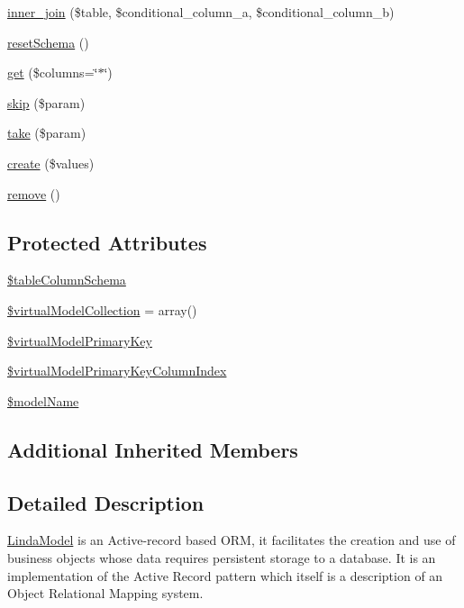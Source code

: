 \begin{DoxyCompactItemize}
\item 
\hyperlink{class_linda_model_a208a1a59285ee5a95a90c5328f3ee31e}{inner\+\_\+join} (\$table, \$conditional\+\_\+column\+\_\+a, \$conditional\+\_\+column\+\_\+b)
\item 
\hyperlink{class_linda_model_a25419fa27bd8ae0cbb5a8e8022166c37}{reset\+Schema} ()
\item 
\hyperlink{class_linda_model_ae245ebfad08a4ad7e5196900032eb0af}{get} (\$columns=\char`\"{}$\ast$\char`\"{})
\item 
\hyperlink{class_linda_model_a65cd50a6fdf5ce1f4a0e45ab930af5fa}{skip} (\$param)
\item 
\hyperlink{class_linda_model_a33ab6a5b47dfbefa83546cab6734f017}{take} (\$param)
\item 
\hyperlink{class_linda_model_a5297010b1eb7d2cce1e0f2ad8d6d8336}{create} (\$values)
\item 
\hyperlink{class_linda_model_aff9a1fb07dca963c2c9a8ffe66b45ded}{remove} ()
\end{DoxyCompactItemize}
\subsection*{Protected Attributes}
\begin{DoxyCompactItemize}
\item 
\hyperlink{class_linda_model_a736ca8a8aaf094b1747b04f00333732c}{\$table\+Column\+Schema}
\item 
\hyperlink{class_linda_model_a1b40070fc765a8a4f2af137240160b50}{\$virtual\+Model\+Collection} = array()
\item 
\hyperlink{class_linda_model_ac155ae9a10f7fe23e69866ef520cc40a}{\$virtual\+Model\+Primary\+Key}
\item 
\hyperlink{class_linda_model_aa95536b6b03272be51030ebe03626f38}{\$virtual\+Model\+Primary\+Key\+Column\+Index}
\item 
\hyperlink{class_linda_model_ac2d5e104b8970095b9463776a94eede0}{\$model\+Name}
\end{DoxyCompactItemize}
\subsection*{Additional Inherited Members}


\subsection{Detailed Description}
\hyperlink{class_linda_model}{Linda\+Model} is an Active-\/record based O\+R\+M, it facilitates the creation and use of business objects whose data requires persistent storage to a database. It is an implementation of the Active Record pattern which itself is a description of an Object Relational Mapping system. 

